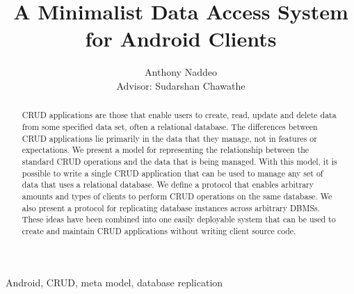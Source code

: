 \documentclass[journal]{IEEEtran}
\begin{document}
\title{A Minimalist Data Access System\\ for Android Clients}
\author{Anthony Naddeo \\ Advisor: Sudarshan Chawathe}

\maketitle


\begin{abstract}
CRUD applications are those that enable users to create, read, update and delete
data from some specified data set, often a relational database. The
differences between CRUD applications lie primarily in the data that they
manage, not in features or expectations. We present a model for representing the
relationship between the standard CRUD operations and the data that is being
managed. With this model, it is possible to write a single CRUD application that
can be used to manage any set of data that uses a relational database. We define
a protocol that enables arbitrary amounts and types of clients to perform CRUD
operations on the same database. We also present a protocol for replicating
database instances across arbitrary DBMSs. These ideas have been combined into
one easily deployable system that can be used to create and maintain CRUD
applications without writing client source code.
\end{abstract}

\begin{IEEEkeywords}
Android, CRUD, meta model, database replication
\end{IEEEkeywords}

\IEEEpeerreviewmaketitle
\tableofcontents
































\end{document}
